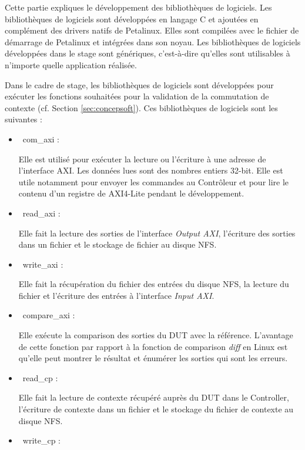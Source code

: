 Cette partie expliques le développement des bibliothèques de logiciels.
Les bibliothèques de logiciels sont développées en langage C et ajoutées en complément
des drivers natifs de Petalinux. Elles sont compilées avec le fichier de démarrage de Petalinux et intégrées dans son noyau. 
Les bibliothèques de logiciels développées dans le stage sont génériques, c'est-à-dire qu'elles
sont utilisables à n'importe quelle application réalisée. 

Dans le cadre de stage, les bibliothèques de logiciels sont développées pour exécuter les fonctions
souhaitées pour la validation de la commutation de contexte (cf. Section \ref{sec:concepsoft}).
Ces bibliothèques de logiciels sont les suivantes : 

\begin{itemize}
	\item\
	com\_axi :
	
	Elle est utilisé pour exécuter la lecture ou l'écriture à une adresse de l'interface AXI. Les données lues sont
	des nombres entiers 32-bit. Elle est utile notamment pour envoyer les commandes au Contrôleur et pour lire
	le contenu d'un registre de AXI4-Lite pendant le développement.

	\item\	
	read\_axi :
	
	Elle fait la lecture des sorties de l'interface \emph{Output AXI}, 
	l'écriture des sorties dans un fichier et le stockage de fichier au disque NFS.
	
	\item\
	write\_axi :
	
	Elle fait la récupération du fichier des entrées du disque NFS, la lecture du fichier et l'écriture des entrées
	à l'interface \emph{Input AXI}.

	\item\
	compare\_axi :
	
	Elle exécute la comparison des sorties du DUT avec la référence.
	L'avantage de cette fonction par rapport à la fonction de comparison \emph{diff} 
	en Linux est qu'elle peut montrer le résultat et énumérer les sorties qui sont les erreurs.

	\item\
	read\_cp :

	Elle fait la lecture de contexte récupéré auprès du DUT dans le Controller, 
	l'écriture de contexte dans un fichier et le stockage du fichier de contexte au disque NFS.
	
	\item\
	write\_cp :
	

\end{itemize}

